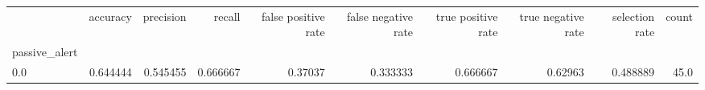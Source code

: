 \begin{tabular}{lrrrrrrrrr}
\toprule
{} &  accuracy &  precision &    recall &  false positive rate &  false negative rate &  true positive rate &  true negative rate &  selection rate &  count \\
passive\_alert &           &            &           &                      &                      &                     &                     &                 &        \\
\midrule
0.0           &  0.644444 &   0.545455 &  0.666667 &              0.37037 &             0.333333 &            0.666667 &             0.62963 &        0.488889 &   45.0 \\
\bottomrule
\end{tabular}

